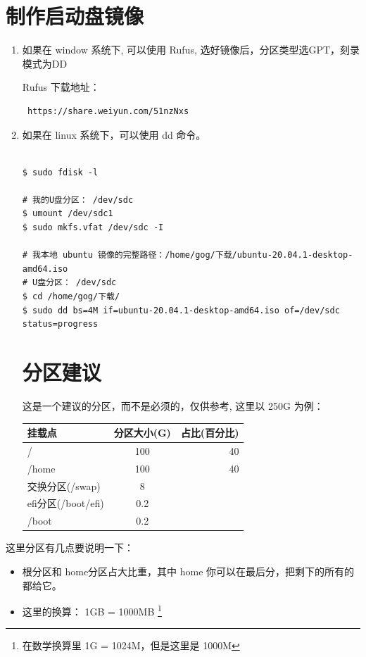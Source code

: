 \section{制作启动盘镜像}
\flushleft
\begin{enumerate}
\item 如果在 window 系统下, 可以使用 Rufus, 选好镜像后，分区类型选GPT，刻录模式为DD

Rufus 下载地址：\\
\begin{lstlisting}
 https://share.weiyun.com/51nzNxs
\end{lstlisting}
\item 如果在 linux 系统下，可以使用 dd 命令。
\begin{lstlisting}

$ sudo fdisk -l 

# 我的U盘分区： /dev/sdc
$ umount /dev/sdc1
$ sudo mkfs.vfat /dev/sdc -I

# 我本地 ubuntu 镜像的完整路径：/home/gog/下载/ubuntu-20.04.1-desktop-amd64.iso 
# U盘分区： /dev/sdc
$ cd /home/gog/下载/
$ sudo dd bs=4M if=ubuntu-20.04.1-desktop-amd64.iso of=/dev/sdc status=progress
\end{lstlisting}

\section{分区建议}
这是一个建议的分区，而不是必须的，仅供参考, 这里以 250G 为例：


\begin{tabular}{|l|c|r|}
\hline
 挂载点 & 分区大小(G) & 占比(百分比)\\
\hline
   / & 100 & 40 \\      
\hline
   /home & 100 & 40 \\      
\hline
  交换分区(/swap) & 8 & \\
\hline
  efi分区(/boot/efi) & 0.2 & \\
\hline
  /boot & 0.2 & \\
\hline

\end{tabular}
\end{enumerate}


\setlength\parindent{2em}这里分区有几点要说明一下：

\begin{itemize}
\item 根分区和 home分区占大比重，其中 home 你可以在最后分，把剩下的所有的都给它。
\item 这里的换算： 1GB = 1000MB \footnote{在数学换算里 1G = 1024M，但是这里是 1000M}
\end{itemize}
